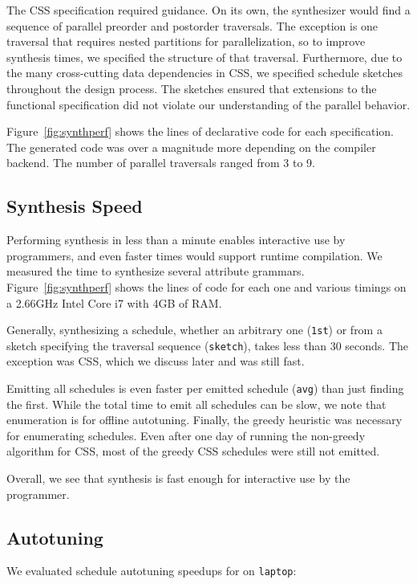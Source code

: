 The CSS specification required guidance. On its own, the synthesizer would find a sequence of parallel preorder and postorder traversals. The exception is one traversal that requires nested partitions  for parallelization, so to improve synthesis times, we specified the structure of that traversal. Furthermore, due to the many cross-cutting data dependencies in CSS, we specified schedule sketches throughout the design process. The sketches ensured that extensions to the functional specification did not violate our understanding of the parallel behavior.

Figure~\ref{fig:synthperf} shows the lines of declarative code for each specification. The generated code was over a magnitude more depending on the compiler backend. The number of parallel traversals ranged from 3 to 9.




\subsection{Synthesis Speed}
Performing synthesis in less than a minute enables interactive use by programmers, and even faster times would support runtime compilation. We measured the time to synthesize several attribute grammars. Figure~\ref{fig:synthperf} shows the lines of code for each one and various timings on a 2.66GHz Intel Core i7 with 4GB of RAM.

Generally, synthesizing a schedule, whether an arbitrary one (\texttt{1st}) or from a sketch specifying the traversal sequence (\texttt{sketch}), takes less than 30 seconds. The exception was CSS, which we discuss later and was still fast. 

Emitting all schedules is even faster per emitted schedule (\texttt{avg}) than just finding the first. While the total time to emit all schedules can be slow, we note that enumeration is for offline autotuning. Finally, the greedy heuristic was necessary for enumerating schedules. Even after one day of running the non-greedy algorithm for CSS, most of the greedy CSS schedules were still not emitted. 

Overall, we see that synthesis is fast enough for interactive use by the programmer.


\subsection{Autotuning}

We evaluated schedule autotuning speedups for \hlangpp{} on \texttt{laptop}:

